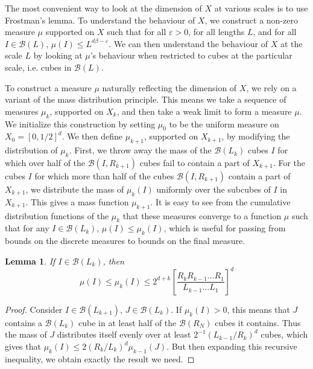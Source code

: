 \documentclass{article}
\theoremstyle{plain}
\newtheorem{lemma}{Lemma}
\theoremstyle{plain}
\begin{document}
The most convenient way to look at the dimension of $X$ at various scales is to use Frostman's lemma. To understand the behaviour of $X$, we construct a non-zero measure $\mu$ supported on $X$ such that for all $\varepsilon > 0$, for all lengths $L$, and for all $I \in \mathcal{B}(L)$, $\mu(I) \leq L^{d\beta - \varepsilon}$. We can then understand the behaviour of $X$ at the scale $L$ by looking at $\mu$'s behaviour when restricted to cubes at the particular scale, i.e. cubes in $\mathcal{B}(L)$.

To construct a measure $\mu$ naturally reflecting the dimension of $X$, we rely on a variant of the mass distribution principle. This means we take a sequence of measures $\mu_k$, supported on $X_k$, and then take a weak limit to form a measure $\mu$. We initialize this construction by setting $\mu_0$ to be the uniform measure on $X_0 = [0,1/2]^d$. We then define $\mu_{k+1}$, supported on $X_{k+1}$, by modifying the distribution of $\mu_k$. First, we throw away the mass of the $\mathcal{B}(L_k)$ cubes $I$ for which over half of the $\mathcal{B}(I,R_{k+1})$ cubes fail to contain a part of $X_{k+1}$. For the cubes $I$ for which more than half of the cubes $\mathcal{B}(I,R_{k+1})$ contain a part of $X_{k+1}$, we distribute the mass of $\mu_k(I)$ uniformly over the subcubes of $I$ in $X_{k+1}$. This gives a mass function $\mu_{k+1}$. It is easy to see from the cumulative distribution functions of the $\mu_k$ that these measures converge to a function $\mu$ such that for any $I \in \mathcal{B}(L_k)$, $\mu(I) \leq \mu_k(I)$, which is useful for passing from bounds on the discrete measures to bounds on the final measure.

\begin{lemma}
	If $I \in \mathcal{B}(L_k)$, then
	\[ \mu(I) \leq \mu_k(I) \leq 2^{d + k} \left[ \frac{R_k R_{k-1} \dots R_1}{L_{k-1} \dots L_1} \right]^d \]
\end{lemma}
\begin{proof}
	Consider $I \in \mathcal{B}(L_{k+1})$, $J \in \mathcal{B}(L_k)$. If $\mu_k(I) > 0$, this means that $J$ contains a $\mathcal{B}(L_k)$ cube in at least half of the $\mathcal{B}(R_N)$ cubes it contains. Thus the mass of $J$ distributes itself evenly over at least $2^{-1} (L_{k-1}/R_k)^d$ cubes, which gives that $\mu_k(I) \leq 2(R_k/L_k)^d \mu_{k-1}(J)$. But then expanding this recursive inequality, we obtain exactly the result we need.
\end{proof}
\end{document}
